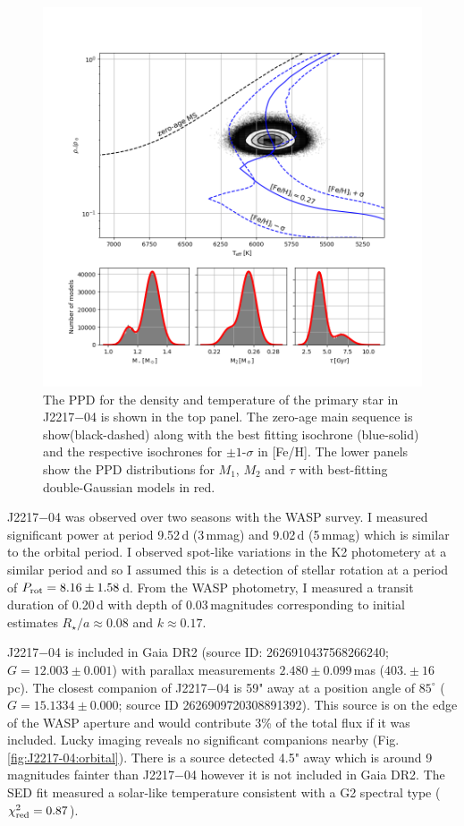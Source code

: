 \begin{figure}
    \centering
    \includegraphics[scale=0.7]{8-Results/J2217-04/HR.png}
    \caption{The PPD for the density and temperature of the primary star in J2217$-$04 is shown in the top panel. The zero-age main sequence is show(black-dashed) along with the best fitting isochrone (blue-solid) and the respective isochrones for $\pm1$-$\sigma$ in [Fe/H]. The lower panels show the PPD distributions for $M_1$, $M_2$ and $\tau$ with best-fitting double-Gaussian models in red.}
    \label{fig:J2217-04:HR}
\end{figure}

J2217$-$04 was observed over two seasons with the WASP survey. I measured significant power at period 9.52\,d (3\,mmag) and 9.02\,d (5\,mmag) which is similar to the orbital period. I observed spot-like variations in the K2 photometery at a similar period and so I assumed this is a detection of stellar rotation at a period of $P_{\rm rot} = 8.16 \pm 1.58$\,d. From the WASP photometry, I measured a transit duration of 0.20\,d with depth of 0.03\,magnitudes corresponding to initial estimates $R_\star/a \approx 0.08$ and $k \approx 0.17$. 

J2217$-$04 is included in Gaia DR2 (source ID: 2626910437568266240; $G = 12.003 \pm 0.001$) with parallax measurements $2.480 \pm 0.099$\,mas ($403. \pm 16$\,pc). The closest companion of J2217$-$04 is 59" away at a position angle of $85^\circ$ ($G = 15.1334\pm0.000$; source ID 2626909720308891392). This source is on the edge of the WASP aperture and would contribute 3\% of the total flux if it was included. Lucky imaging reveals no significant companions nearby (Fig. \ref{fig:J2217-04:orbital}). There is a source detected 4.5" away which is around 9 magnitudes fainter than J2217$-$04 however it is not included in Gaia DR2.  The SED fit measured a solar-like temperature consistent with a G2 spectral type ($\chi_{\rm red}^2 = 0.87$). 


